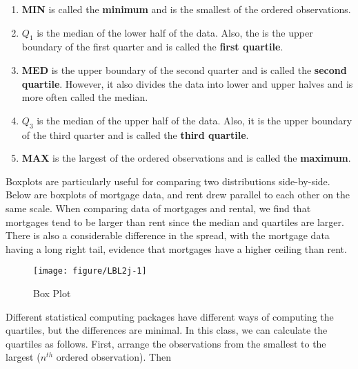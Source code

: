 \documentclass[11pt]{book}\usepackage[]{graphicx}\usepackage[]{color}
\begin{document}
{\small{
\begin{enumerate}
\item	\textbf{MIN} is called the \textbf{minimum} and is the smallest of the ordered observations.
\item	\textbf{$Q_1$} is the median of the lower half of the data.  Also, the is the upper boundary of the first quarter and is called the \textbf{first quartile}.
\item	\textbf{MED} is the upper boundary of the second quarter and is called the \textbf{second quartile}.  However, it also divides the data into lower and upper halves and is more often called the median.
\item	\textbf{$Q_3$} is the median of the upper half of the data.  Also, it is the upper boundary of the third quarter and is called the \textbf{third quartile}.
\item	\textbf{MAX} is the largest of the ordered observations and is called the \textbf{maximum}.
\end{enumerate}
}}

Boxplots are particularly useful for comparing two distributions side-by-side.  Below are boxplots of mortgage data, and rent drew parallel to each other on the same scale.  When comparing data of mortgages and rental, we find that mortgages tend to be larger than rent since the median and quartiles are larger.  There is also a considerable difference in the spread, with the mortgage data having a long right tail, evidence that mortgages have a higher ceiling than rent.

\begin{figure}[ht]

\caption{Box Plot }



{\centering \texttt{[image: figure/LBL2j-1]} 

}




\end{figure}

\newpage 

Different statistical computing packages have different ways of computing the quartiles, but the differences are minimal.  In this class, we can calculate the quartiles as follows.  First, arrange the observations from the smallest to the largest ($n^{th}$ ordered observation).  Then

\end{document}
